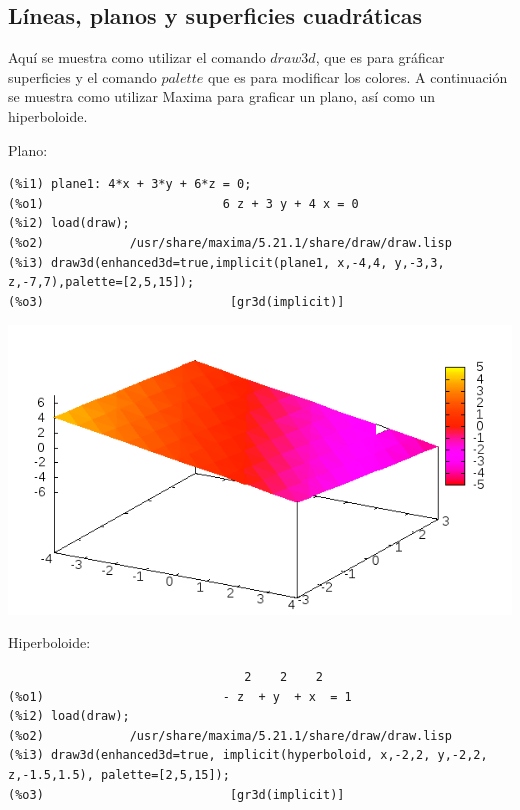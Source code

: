\documentclass[12pt,letterpaper]{article}
\begin{document}
\subsection{Líneas, planos y superficies cuadráticas}

Aquí se muestra como utilizar el comando $draw3d$, que es para gráficar superficies y el comando $palette$ que es para modificar los colores. A continuación se muestra como utilizar Maxima para graficar un plano, así como un hiperboloide. 

Plano: 

\begin{verbatim}
(%i1) plane1: 4*x + 3*y + 6*z = 0;
(%o1)                         6 z + 3 y + 4 x = 0
(%i2) load(draw);
(%o2)            /usr/share/maxima/5.21.1/share/draw/draw.lisp
(%i3) draw3d(enhanced3d=true,implicit(plane1, x,-4,4, y,-3,3, z,-7,7),palette=[2,5,15]);
(%o3)                          [gr3d(implicit)]
\end{verbatim}

\begin{center}
\includegraphics[scale=0.6]{plano1.png}
\end{center}

Hiperboloide: 
\begin{verbatim}
                                 2    2    2
(%o1)                         - z  + y  + x  = 1
(%i2) load(draw);
(%o2)            /usr/share/maxima/5.21.1/share/draw/draw.lisp
(%i3) draw3d(enhanced3d=true, implicit(hyperboloid, x,-2,2, y,-2,2, z,-1.5,1.5), palette=[2,5,15]);
(%o3)                          [gr3d(implicit)]
\end{verbatim}
\end{document}
